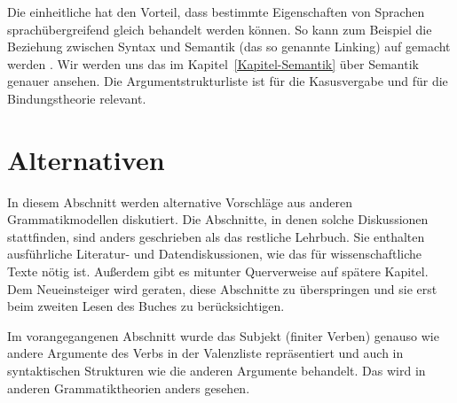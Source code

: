 Die einheitliche \argstl hat den Vorteil, dass bestimmte Eigenschaften von Sprachen sprachübergreifend
gleich behandelt werden können. So kann zum Beispiel die Beziehung zwischen Syntax und Semantik (das
so genannte Linking) auf \argst gemacht werden \citep*{DKW2024a}. Wir werden uns das im Kapitel~\ref{Kapitel-Semantik}
über Semantik genauer ansehen. Die Argumentstrukturliste ist für die Kasusvergabe
und für die Bindungstheorie relevant.
  

\section{Alternativen}

In diesem Abschnitt werden alternative Vorschläge aus anderen Grammatikmodellen diskutiert.
Die Abschnitte, in denen solche Diskussionen stattfinden, sind anders geschrieben als das restliche
Lehrbuch. Sie enthalten ausführliche Literatur- und Datendiskussionen, wie das für wissenschaftliche
Texte nötig ist. Außerdem gibt es mitunter Querverweise auf spätere Kapitel. Dem Neueinsteiger
wird geraten, diese Abschnitte zu überspringen und sie erst beim zweiten Lesen des Buches zu berücksichtigen.

Im vorangegangenen Abschnitt wurde das Subjekt (finiter Verben) genauso wie andere Argumente des Verbs
in der Valenzliste repräsentiert und auch in syntaktischen Strukturen wie die anderen
Argumente behandelt. Das wird in anderen Grammatiktheorien anders gesehen.

